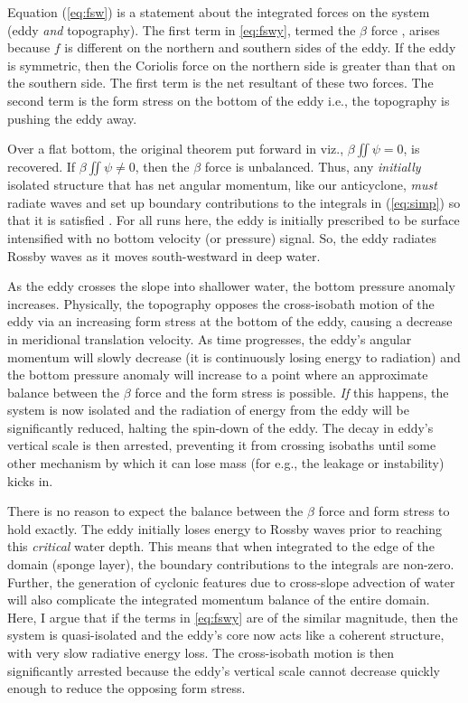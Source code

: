 Equation (\ref{eq:fsw}) is a statement about the integrated forces on the system (eddy \emph{and} topography). The first term in \eqref{eq:fswy}, termed the $β$ force \citep{Nof1983}, arises because $f$ is different on the northern and southern sides of the eddy. If the eddy is symmetric, then the Coriolis force on the northern side is greater than that on the southern side. The first term is the net resultant of these two forces. The second term is the form stress on the bottom of the eddy i.e., the topography is pushing the eddy away.

Over a flat bottom, the original theorem put forward in \citet{Flierl1983} viz., $β \iint ψ = 0$, is recovered. If $β\iint ψ ≠ 0$, then the $β$ force is unbalanced.  Thus, any \emph{initially} isolated structure that has net angular momentum, like our anticyclone, \emph{must} radiate waves and set up boundary contributions to the integrals in (\ref{eq:simp}) so that it is satisfied \citep{Flierl1987}. For all runs here, the eddy is initially prescribed to be surface intensified with no bottom velocity (or pressure) signal. So, the eddy radiates Rossby waves as it moves south-westward in deep water.

As the eddy crosses the slope into shallower water, the bottom pressure anomaly increases. Physically, the topography opposes the cross-isobath motion of the eddy via an increasing form stress at the bottom of the eddy, causing a decrease in meridional translation velocity. As time progresses, the eddy's angular momentum will slowly decrease (it is continuously losing energy to radiation) and the bottom pressure anomaly will increase to a point where an approximate balance between the $β$ force and the form stress is possible. \emph{If} this happens, the system is now isolated and the radiation of energy from the eddy will be significantly reduced, halting the spin-down of the eddy. The decay in eddy's vertical scale is then arrested, preventing it from crossing isobaths until some other mechanism by which it can lose mass (for e.g., the leakage or instability) kicks in.

There is no reason to expect the balance between the $β$ force and form stress to hold exactly. The eddy initially loses energy to Rossby waves prior to reaching this \emph{critical} water depth. This means that when integrated to the edge of the domain (sponge layer), the boundary contributions to the integrals are non-zero. Further, the generation of cyclonic features \citep[for e.g.,][]{Wang1992, Oey2004,Frolov2004} due to cross-slope advection of water will also complicate the integrated momentum balance of the entire domain. Here, I argue that if the terms in \eqref{eq:fswy} are of the similar magnitude, then the system is quasi-isolated and the eddy's core now acts like a coherent structure, with very slow radiative energy loss. The cross-isobath motion is then significantly arrested because the eddy's vertical scale cannot decrease quickly enough to reduce the opposing form stress.

